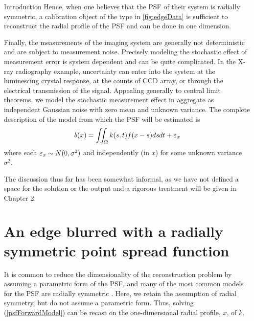 \begin{chapter}{Introduction}
  Hence, when one believes that the PSF of their system is radially symmetric, a calibration object of the type in \cref{fig:edgeData} is sufficient to reconstruct the radial profile of the PSF and can be done in one dimension.

  Finally, the measurements of the imaging system are generally not deterministic and are subject to measurement noise.
  Precisely modeling the stochastic effect of measurement error is system dependent and can be quite complicated.
  In the X-ray radiography example, uncertainty can enter into the system at the luminescing crystal response, at the counts of CCD array, or through the electrical transmission of the signal.
  Appealing generally to central limit theorems, we model the stochastic measurement effect in aggregate as independent Gaussian noise with zero mean and unknown variance.  
  The complete description of the model from which the PSF will be estimated is
\begin{equation}\label{eq:psfForwardModelStochastic} 
  b(x) = \iint_{\Omega} k(s,t) f(x-s)dsdt + \varepsilon_x  
\end{equation}
  where each $\varepsilon_x \sim N(0,\sigma^2)$ and independently (in $x$) for some unknown variance $\sigma^2$.

  The discussion thus far has been somewhat informal, as we have not defined a space for the solution or the output and a rigorous treatment will be given in Chapter 2.

\section{An edge blurred with a radially symmetric point spread function}

It is common to reduce the dimensionality of the reconstruction problem by assuming a parametric form of the PSF, and many of the most common models for the PSF are radially symmetric \citep{doering1992,jain1989,kundur1996blind,watson1993}.
Here, we retain the assumption of radial symmetry, but do not assume a parametric form. Thus, solving (\ref{psfForwardModel}) can be recast on the one-dimensional radial profile, $x$, of $k$.


\end{chapter}
